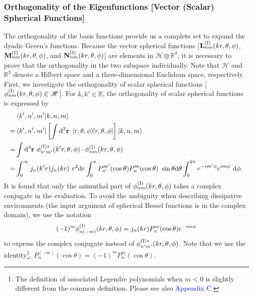 \documentclass[journal=jacsat,manuscript=article,layout=traditional]{achemso}
\newcommand*\diff{\mathrm{d}}
\newcommand*\br{\mathbf{r}}
\newcommand*\blue[1]{\textcolor{blue}{#1}}
\newcommand{\RomanI}{\scriptsize\textrm{I}}
\begin{document}
\subsubsection{Orthogonality of the Eigenfunctions [Vector (Scalar) Spherical Functions]}
The orthogonality of the basis functions provide us a complete set to expand the dyadic Green's functions.
Because the vector spherical functions [$\mathbf{L}_{nm}^{(\RomanI)}(kr,\theta,\phi)$, $\mathbf{M}_{nm}^{(\RomanI)}(kr,\theta,\phi)$, and $\mathbf{N}_{nm}^{(\RomanI)}(kr,\theta,\phi)$] are elements in $\mathcal{H}\otimes\mathbb{R}^3$, it is necessary to prove that the orthogonality in the two subspace individually.
Note that $\mathcal{H}$ and $\mathbb{R}^3$ denote a Hilbert space and a three-dimensional Euclidean space, respectively.
First, we investigate the orthogonality of scalar spherical functions [$\phi_{nm}^{(\RomanI)}(kr,\theta,\phi)\in\mathcal{H}$].
For $k,k'\in\mathbb{R}$, the orthogonality of scalar spherical functions is expressed by 
\begin{align}
    \nonumber
    &\braket{k',n',m'}{k,n,m}\\
    \nonumber
    =& \bra{k',n',m'}\left[\int\diff^3\br~\dyad{r,\theta,\phi}\right]\ket{k,n,m}\\
    \nonumber
    =&\int\diff^3\br~\phi_{n'm'}^{(\RomanI)*}(k'r,\theta,\phi)\cdot\phi_{nm}^{(\RomanI)}(kr,\theta,\phi)\\
    =&\int_0^\infty j_n(k'r)j_n(kr)~r^2\diff r \int_0^\pi P_{n'}^{m'}(\cos\theta)P_n^m(\cos\theta)~\sin\theta\diff\theta \int_0^{2\pi} e^{-im'\phi}e^{im\phi}~\diff\phi.
\end{align}
It is found that only the azimuthal part of $\phi_{nm}^{(\RomanI)}(kr,\theta,\phi)$ takes a complex conjugate in the evaluation.
To avoid the ambiguity when describing dissipative environments (the input argument of spherical Bessel functions is in the complex domain), we use the notation
\begin{align}
    (-1)^m\phi_{n(-m)}^{(\RomanI)}(kr,\theta,\phi) = j_n(kr)P_n^{m}(\cos\theta)e^{-im\phi}
    \label{Eq:newcc}
\end{align}
to express the complex conjugate instead of $\phi_{n'm'}^{(\RomanI)*}(kr,\theta,\phi)$.
Note that we use the identity\footnote{The definition of associated Legendre polynomials when $m<0$ is slightly different from the common definition. Please see also \blue{Appendix C}.}, $P_n^{(-m)}(\cos\theta)=(-1)^mP_n^{m}(\cos\theta)$.
\end{document}
